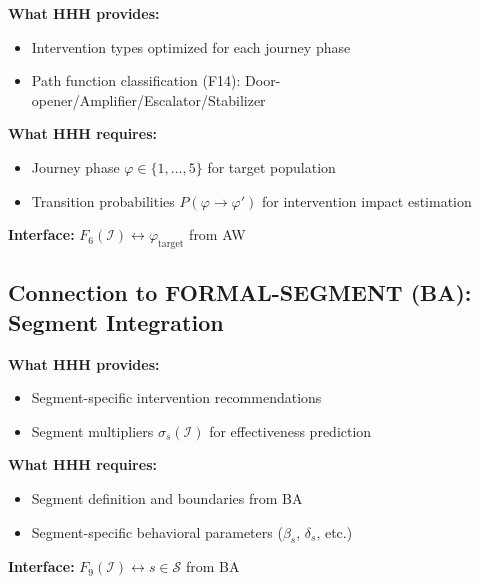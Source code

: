 \begin{tcolorbox}[colback=yellow!5!white, colframe=yellow!75!black,
    title=Integration: HHH $\leftrightarrow$ CORE-STAGE (AW)]
\textbf{What HHH provides:}
\begin{itemize}[nosep]
\item Intervention types optimized for each journey phase
\item Path function classification (F14): Door-opener/Amplifier/Escalator/Stabilizer
\end{itemize}

\textbf{What HHH requires:}
\begin{itemize}[nosep]
\item Journey phase $\varphi \in \{1, \ldots, 5\}$ for target population
\item Transition probabilities $P(\varphi \to \varphi')$ for intervention impact estimation
\end{itemize}

\textbf{Interface:} $F_6(\mathcal{I}) \leftrightarrow \varphi_{\text{target}}$ from AW
\end{tcolorbox}

\subsection{Connection to FORMAL-SEGMENT (BA): Segment Integration}

\begin{tcolorbox}[colback=yellow!5!white, colframe=yellow!75!black,
    title=Integration: HHH $\leftrightarrow$ FORMAL-SEGMENT (BA)]
\textbf{What HHH provides:}
\begin{itemize}[nosep]
\item Segment-specific intervention recommendations
\item Segment multipliers $\sigma_s(\mathcal{I})$ for effectiveness prediction
\end{itemize}

\textbf{What HHH requires:}
\begin{itemize}[nosep]
\item Segment definition and boundaries from BA
\item Segment-specific behavioral parameters ($\beta_s$, $\delta_s$, etc.)
\end{itemize}

\textbf{Interface:} $F_9(\mathcal{I}) \leftrightarrow s \in \mathcal{S}$ from BA
\end{tcolorbox}

